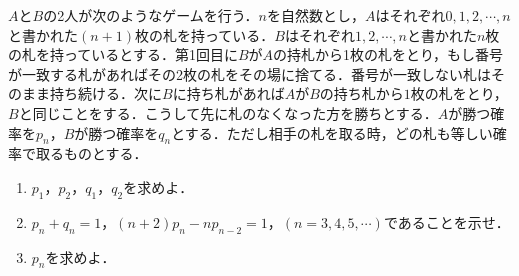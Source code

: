 \documentclass[../../main.tex]{subfiles}
\begin{document}
$A$と$B$の2人が次のようなゲームを行う．$n$を自然数とし，$A$はそれぞれ$0,1,2,\cdots,n$と書かれた$(n+1)$枚の札を持っている．$B$はそれぞれ$1,2,\cdots,n$と書かれた$n$枚の札を持っているとする．第1回目に$B$が$A$の持札から1枚の札をとり，もし番号が一致する札があればその2枚の札をその場に捨てる．番号が一致しない札はそのまま持ち続ける．次に$B$に持ち札があれば$A$が$B$の持ち札から$1$枚の札をとり，$B$と同じことをする．こうして先に札のなくなった方を勝ちとする．$A$が勝つ確率を$p_n$，$B$が勝つ確率を$q_n$とする．ただし相手の札を取る時，どの札も等しい確率で取るものとする．

\begin{enumerate}
  \item $p_1$，$p_2$，$q_1$，$q_2$を求めよ．
  \item $p_n+q_n=1$，$(n+2)p_n-np_{n-2}=1$，$(n=3,4,5,\cdots)$であることを示せ．
  \item $p_n$を求めよ．
\end{enumerate}
\end{document}

